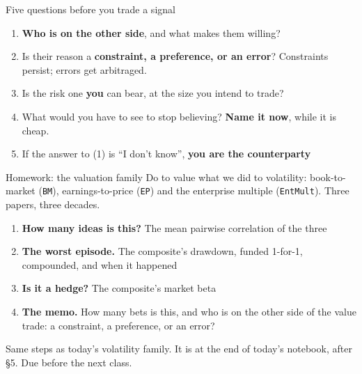 \documentclass[aspectratio=169,10pt]{beamer}
\begin{document}
\begin{frame}{Five questions before you trade a signal}
\begin{enumerate}
\item \textbf{Who is on the other side}, and what makes them willing?
\vskip 8pt
\item Is their reason a \textbf{constraint, a preference, or an error}? Constraints persist; errors get arbitraged.
\vskip 8pt
\item Is the risk one \textbf{you} can bear, at the size you intend to trade?
\vskip 8pt
\item What would you have to see to stop believing? \textbf{Name it now}, while it is cheap.
\vskip 8pt
\item If the answer to (1) is ``I don't know'', \textbf{you are the counterparty}
\end{enumerate}
\end{frame}

\begin{frame}{Homework: the valuation family}
Do to value what we did to volatility: book-to-market (\texttt{BM}), earnings-to-price (\texttt{EP}) and the enterprise multiple (\texttt{EntMult}). Three papers, three decades.
\vskip 8pt
\begin{enumerate}
\item[Q1] \textbf{How many ideas is this?} The mean pairwise correlation of the three
\vskip 4pt
\item[Q2] \textbf{The worst episode.} The composite's drawdown, funded 1-for-1, compounded, and when it happened
\vskip 4pt
\item[Q3] \textbf{Is it a hedge?} The composite's market beta
\vskip 4pt
\item[Q4] \textbf{The memo.} How many bets is this, and who is on the other side of the value trade: a constraint, a preference, or an error?
\end{enumerate}
\vskip 6pt
{\small Same steps as today's volatility family. It is at the end of today's notebook, after §5. Due before the next class.}
\end{frame}
\end{document}

